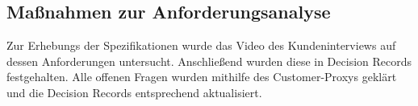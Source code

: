 	
\subsection{Maßnahmen zur Anforderungsanalyse}
Zur Erhebungs der Spezifikationen wurde das Video des Kundeninterviews auf dessen Anforderungen untersucht. Anschließend wurden diese in Decision Records festgehalten. Alle offenen Fragen wurden mithilfe des Customer-Proxys geklärt und die Decision Records entsprechend aktualisiert.

